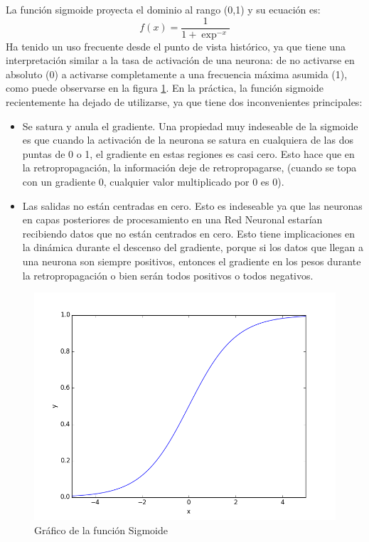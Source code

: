 \documentclass[a4paper,11pt,spanish]{book}
\begin{document}
	    La función sigmoide proyecta el dominio al rango (0,1) y su ecuación es:
	    \begin{equation*}
	     f(x) = \frac{1}{1+\exp^{-x}}
	    \end{equation*}
	    Ha tenido un uso frecuente desde el punto de vista histórico, ya que tiene una interpretación similar a la tasa de activación de una neurona:
	    de no activarse en absoluto (0) a activarse completamente a una frecuencia máxima asumida (1), como puede observarse en la figura \ref{fig:sigmoid}. 
	    En la práctica, la función sigmoide recientemente ha dejado de utilizarse, ya que tiene dos inconvenientes principales:
	    \begin{itemize}
	     \item Se satura y anula el gradiente. Una propiedad muy indeseable de la sigmoide es que cuando la activación de la neurona se satura en cualquiera de las dos 
	     puntas de 0 o 1, el gradiente en estas regiones es casi cero. 
	     Esto hace que en la retropropagación, la información deje de retropropagarse, (cuando se topa con un gradiente 0, cualquier valor multiplicado por 0
	     es 0).
	     \item Las salidas no están centradas en cero.
	     Esto es indeseable ya que las neuronas en capas posteriores de procesamiento en una Red Neuronal estarían recibiendo datos que no están centrados en cero. 
	     Esto tiene implicaciones en la dinámica durante el descenso del gradiente, porque si los datos que llegan a una neurona son siempre positivos, entonces el 
	     gradiente en los pesos durante la retropropagación o bien serán todos positivos o todos negativos.
	    \end{itemize}
	    \begin{figure}[ht]
	      \begin{center}
	       \includegraphics[width=0.4\linewidth]{./img/sigmoid.png}
	      \end{center}
	      \caption{Gráfico de la función Sigmoide}
	      \label{fig:sigmoid}
	    \end{figure}
\end{document}
